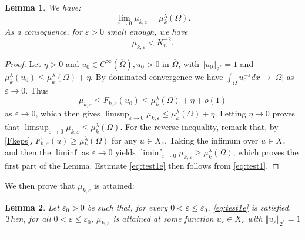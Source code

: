 \documentclass[10pt]{amsart}
\numberwithin{equation}{section}
\newcommand{\ve}{\varepsilon}
\newcommand{\Om}{\Omega}
\newcommand{\mkl}{\mu_{k}^{\lambda}}
\newcommand{\mkle}{\mu_{k,\ve}}
\newcommand{\Fke}{F_{k,\ve}}
\theoremstyle{plain}
\newtheorem{lemme}{Lemma}[section]%
\theoremstyle{remark}
\begin{document}
\begin{lemme} \label{lemme1}
We have:
$$ \lim_{\ve \to 0} \mkle = \mkl(\Om). $$
As a consequence, for $\ve >0$ small enough, we have 
\begin{equation} \label{eq:test1e}
\mkle < K_n^{-2}.
\end{equation}
\end{lemme}

\begin{proof}
Let $\eta >0$ and $u_0\in C^\infty(\overline{\Om}), u_0 >0$ in $\overline{\Om}$, with $\Vert u_0 \Vert_{2^*} = 1$ and $\mkl(u_0) \le \mkl(\Om) + \eta$. By dominated convergence we have $\int_{\Om} u_0^{-\ve}dx \to |\Om|$ as $\ve \to 0$. Thus 
$$\mkle \le  \Fke(u_0) \le  \mkl(\Om) + \eta + o(1) $$
as $\ve \to 0$, which then gives $ \limsup_{\ve \to 0} \mkle \le \mkl(\Om) + \eta$. Letting $\eta \to 0$ proves that $ \limsup_{\ve \to 0} \mkle \le \mkl(\Om) $. For the reverse inequality, remark that, by \eqref{Fkeps}, $\Fke(u) \ge \mkl(\Om)$ for any $u  \in X_\ve$. Taking the infimum over $u \in X_\ve$ and then the $\liminf$ as $\ve \to 0$ yields $\liminf_{\ve \to 0} \mkle \ge \mkl(\Om)$, which proves the first part of the Lemma. Estimate \eqref{eq:test1e} then follows from \eqref{eq:test1}.
\end{proof}

We then prove that $\mkle$ is attained:

\begin{lemme} \label{lemme2}
Let $\ve_0 >0$ be such that, for every $0 < \ve \le \ve_0$, \eqref{eq:test1e} is satisfied. Then, for all $0 < \ve \le \ve_0$, $\mkle$ is attained at some function $u_\ve \in X_\ve $ with $\Vert u_\ve \Vert_{2^*} = 1$.   
\end{lemme}
\end{document}
